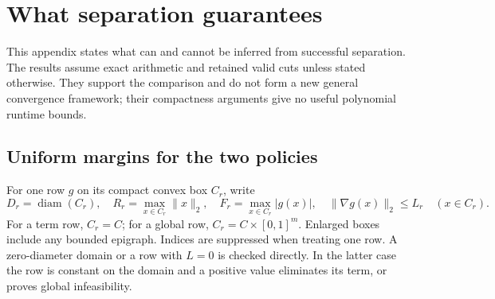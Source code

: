 \section{What separation guarantees}\label{sec:theory}
This appendix states what can and cannot be inferred from successful separation. The results assume exact arithmetic and retained valid cuts unless stated otherwise. They support the comparison and do not form a new general convergence framework; their compactness arguments give no useful polynomial runtime bounds.

\subsection{Uniform margins for the two policies}
For one row $g$ on its compact convex box $C_r$, write
\[
 D_r=\operatorname{diam}(C_r),\quad R_r=\max_{x\in C_r}\|x\|_2,
 \quad F_r=\max_{x\in C_r}|g(x)|,\quad
 \|\nabla g(x)\|_2\le L_r\quad(x\in C_r).
\]
For a term row, $C_r=C$; for a global row, $C_r=C\times[0,1]^m$. Enlarged boxes include any bounded epigraph. Indices are suppressed when treating one row. A zero-diameter domain or a row with $L=0$ is checked directly. In the latter case the row is constant on the domain and a positive value eliminates its term, or proves global infeasibility.

